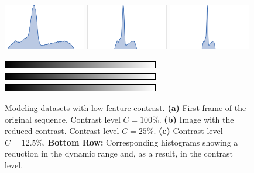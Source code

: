 \begin{figure}[!ht]
  \centerline{
    \mbox{}
    \mbox{}
    \mbox{}
    }   
     \vspace{3pt}
   \centerline{
   	\mbox{\includegraphics[width=0.3215\textwidth]{figures/hyd1_n00_hist.pdf}}
   	\mbox{\includegraphics[width=0.3215\textwidth]{figures/hyd1_c_100_hist.pdf}}
   	\mbox{\includegraphics[width=0.3215\textwidth]{figures/hyd1_c_200_hist.pdf}}
   }
   
   \centerline{
   	\mbox{\includegraphics[scale=0.565]{figures/hist.png}}
   	\mbox{\includegraphics[scale=0.565]{figures/hist.png}}
   	\mbox{\includegraphics[scale=0.565]{figures/hist.png}}
   }
  \caption[Modeling contrast]{Modeling datasets with low feature contrast. \textbf{(a)} First frame of the original sequence. Contrast level $C = 100\%$. \textbf{(b)} Image with the reduced contrast.  Contrast level $C = 25\%$. \textbf{(c)} Contrast level $C = 12.5\%$. \textbf{Bottom Row:} Corresponding histograms showing a reduction in the dynamic range and, as a result, in the contrast level.}
  \label{fig:contrast_level}
\end{figure}

